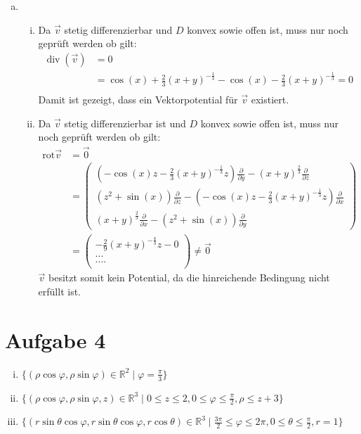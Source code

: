 \documentclass[10pt,a4paper,parskip=half]{scrartcl}
\begin{document}
\begin{enumerate}[(a)]
\item 
\begin{enumerate}[(i)]
	\item 
Da $\vec v$ stetig differenzierbar und $D$ konvex sowie offen ist, muss nur noch geprüft werden ob gilt:
\begin{align*}
\operatorname{div} ( \vec v ) &= 0\\
&= \cos(x) + \frac 23(x+y)^{-\frac 13} - \cos (x) - \frac 23(x+y)^{-\frac 13} = 0\\
\end{align*}
Damit ist gezeigt, dass ein Vektorpotential für $\vec v$ existiert.
\item 
Da $\vec v$ stetig differenzierbar ist und $D$ konvex sowie offen ist, muss nur noch geprüft werden ob gilt:
\begin{align*}
\text{rot} \vec v &= \vec 0\\
&= \begin{pmatrix}
\left(-\cos(x)z-\frac 23(x+y)^{-\frac 13}z \right)\frac {\partial}{\partial y} - (x+y)^{\frac 23} \frac{\partial}{\partial z} \\
\left(z^2  + \sin(x)\right) \frac{\partial}{\partial z} -\left(-\cos(x)z-\frac 23(x+y)^{-\frac 13}z \right) \frac{\partial}{\partial x}\\
(x+y)^{\frac 23} \frac{\partial}{\partial x} - \left( z^2 + \sin(x) \right) \frac{\partial}{\partial y}
\end{pmatrix}\\
&= \begin{pmatrix}
-\frac 29(x+y)^{-\frac 43}z -0 \\
...\\
....\\
\end{pmatrix} \neq \vec 0
\end{align*}
$\vec v$ besitzt somit kein Potential, da die hinreichende Bedingung nicht erfüllt ist.
\end{enumerate}
\end{enumerate}

\section*{Aufgabe 4}

\begin{enumerate}[(i)]
\item
$\lbrace (\rho \cos \varphi, \rho \sin \varphi) \in \mathbb{R}^2 \mid \varphi = \frac{\pi}{3} \rbrace$
\item
$\lbrace (\rho \cos \varphi, \rho \sin \varphi, z) \in \mathbb{R}^3 \mid 0 \le z \le 2, 0 \le \varphi \le \frac{\pi}{2}, \rho \le z + 3\rbrace$
\item
$\lbrace (r \sin \theta \cos \varphi, r \sin \theta \cos \varphi, r \cos \theta ) \in \mathbb{R}^3 \mid \frac{3\pi}{2} \le \varphi \le 2\pi, 0
\le \theta \le \frac{\pi}{2}, r = 1\rbrace$
\end{enumerate}
\end{document}
